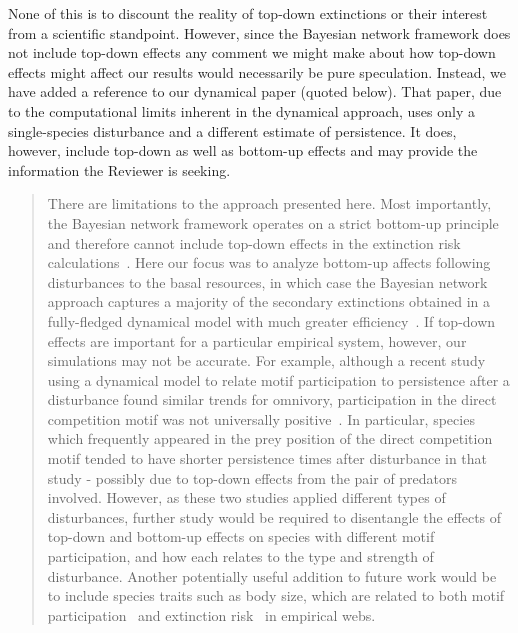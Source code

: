 \documentclass[12pt]{article}
\begin{document}
\begin{enumerate}
                None of this is to discount the reality of top-down extinctions or their interest from a scientific standpoint. However, since the Bayesian network framework does not include top-down effects any comment we might make about how top-down effects might affect our results would necessarily be pure speculation. Instead, we have added a reference to our dynamical paper (quoted below). That paper, due to the computational limits inherent in the dynamical approach, uses only a single-species disturbance and a different estimate of persistence. It does, however, include top-down as well as bottom-up effects and may provide the information the Reviewer is seeking.


                \begin{quotation}
                    There are limitations to the approach presented here.
                    Most importantly, the Bayesian network framework operates on a strict bottom-up principle and therefore cannot include top-down effects in the extinction risk calculations~\citep{Eklof2013}. 
                    Here our focus was to analyze bottom-up affects following disturbances to the basal resources, in which case the Bayesian network approach captures a majority of the secondary extinctions obtained in a fully-fledged dynamical model with much greater efficiency~\citep{Eklof2013}.
                    If top-down effects are important for a particular empirical system, however, our simulations may not be accurate. 
                    For example, although a recent study using a dynamical model to relate motif participation to persistence after a disturbance found similar trends for omnivory, participation in the direct competition motif was not universally positive~\citep{Cirtwill2022Oikos}.
                    In particular, species which frequently appeared in the prey position of the direct competition motif tended to have shorter persistence times after disturbance in that study - possibly due to top-down effects from the pair of predators involved.
                    However, as these two studies applied different types of disturbances, further study would be required to disentangle the effects of top-down and bottom-up effects on species with different motif participation, and how each relates to the type and strength of disturbance.
                    Another potentially useful addition to future work would be to include species traits such as body size, which are related to both motif participation~\citep{cirtwill2018feeding} and extinction risk~\citep{Brose2017,Cardillo2005,Purvis2000} in empirical webs.
                \end{quotation}



\end{enumerate}
\end{document}
